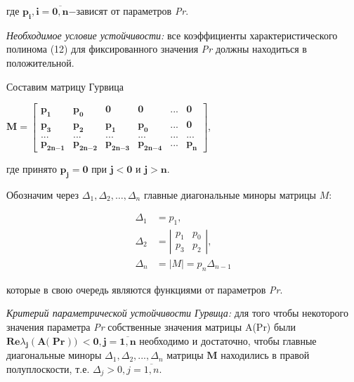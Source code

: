 где
\(\mathbf{p}_{\mathbf{i}}\mathbf{,i =}\overline{\mathbf{0,n}}\mathbf{-}\)зависят
от параметров \emph{Pr}.

\emph{Необходимое условие устойчивости:} все коэффициенты
характеристического полинома (12) для фиксированного значения \emph{Pr}
должны находиться в положительной.

Составим матрицу Гурвица

\(\mathbf{M =}\begin{bmatrix}
\mathbf{p}_{\mathbf{1}} & \mathbf{p}_{\mathbf{0}} & \mathbf{0} & \mathbf{0} & \mathbf{...} & \mathbf{0} \\
\mathbf{p}_{\mathbf{3}} & \mathbf{p}_{\mathbf{2}} & \mathbf{p}_{\mathbf{1}} & \mathbf{p}_{\mathbf{0}} & \mathbf{...} & \mathbf{0} \\
\mathbf{...} & \mathbf{...} & \mathbf{...} & \mathbf{...} & \mathbf{...} & \mathbf{...} \\
\mathbf{p}_{\mathbf{2}\mathbf{n}\mathbf{-}\mathbf{1}} & \mathbf{p}_{\mathbf{2}\mathbf{n}\mathbf{-}\mathbf{2}} & \mathbf{p}_{\mathbf{2}\mathbf{n}\mathbf{-}\mathbf{3}} & \mathbf{p}_{\mathbf{2}\mathbf{n}\mathbf{-}\mathbf{4}} & \mathbf{...} & \mathbf{p}_{\mathbf{n}}
\end{bmatrix}\),

где принято \(\mathbf{p}_{\mathbf{j}}\mathbf{= 0}\) при
\(\mathbf{j < 0}\) и \(\mathbf{j > n}\).

Обозначим через
\(\Delta_{1}, \Delta_{2}, \ldots, \Delta_{n}\)
главные диагональные миноры матрицы \(M\):

\[
\begin{array}{rl}
\Delta_{1} & = p_{1}, \\
\Delta_{2} & = \left| \begin{matrix}
p_{1} & p_{0} \\
p_{3} & p_{2}
\end{matrix} \right|, \\
\Delta_{n} & = \left| M \right| = p_{n} \Delta_{n-1}
\end{array}
\]


которые в свою очередь являются функциями от параметров \emph{Pr}.

\emph{Критерий параметрической устойчивости Гурвица:} для того чтобы
некоторого значения параметра \emph{Pr} собственные значения матрицы
A(Pr) были
\(\mathbf{Re}{\lambda}_{\mathbf{j}}\left( \mathbf{A(}\mathbf{\Pr}\mathbf{)} \right)\mathbf{< 0,j =}\overline{\mathbf{1,n}}\)
необходимо и достаточно, чтобы главные диагональные миноры
\({\Delta}_{{1}}{,}{\Delta}_{{2}}{,...,}{\Delta}_{{n}}\)
матрицы \(\mathbf{M}\) находились в правой полуплоскости, т.е.
\({\Delta}_{{j}}{> 0,j =}\overline{{1,n}}\).


